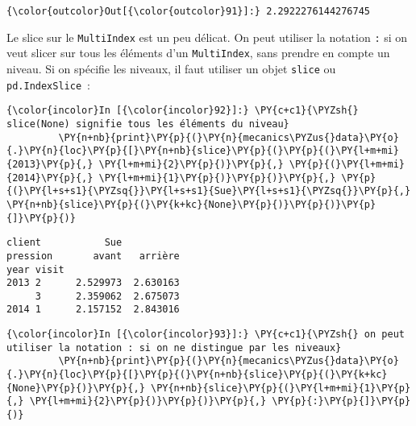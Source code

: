 \begin{Verbatim}[commandchars=\\\{\},frame=single,framerule=0.3mm,rulecolor=\color{cellframecolor}]
{\color{outcolor}Out[{\color{outcolor}91}]:} 2.2922276144276745
\end{Verbatim}
            
    Le slice sur le \texttt{MultiIndex} est un peu délicat. On peut utiliser
la notation \texttt{:} si on veut slicer sur tous les éléments d'un
\texttt{MultiIndex}, sans prendre en compte un niveau. Si on spécifie
les niveaux, il faut utiliser un objet \texttt{slice} ou
\texttt{pd.IndexSlice}~:

    \begin{Verbatim}[commandchars=\\\{\},frame=single,framerule=0.3mm,rulecolor=\color{cellframecolor}]
{\color{incolor}In [{\color{incolor}92}]:} \PY{c+c1}{\PYZsh{} slice(None) signifie tous les éléments du niveau}
         \PY{n+nb}{print}\PY{p}{(}\PY{n}{mecanics\PYZus{}data}\PY{o}{.}\PY{n}{loc}\PY{p}{[}\PY{n+nb}{slice}\PY{p}{(}\PY{p}{(}\PY{l+m+mi}{2013}\PY{p}{,} \PY{l+m+mi}{2}\PY{p}{)}\PY{p}{,} \PY{p}{(}\PY{l+m+mi}{2014}\PY{p}{,} \PY{l+m+mi}{1}\PY{p}{)}\PY{p}{)}\PY{p}{,} \PY{p}{(}\PY{l+s+s1}{\PYZsq{}}\PY{l+s+s1}{Sue}\PY{l+s+s1}{\PYZsq{}}\PY{p}{,} \PY{n+nb}{slice}\PY{p}{(}\PY{k+kc}{None}\PY{p}{)}\PY{p}{)}\PY{p}{]}\PY{p}{)}
\end{Verbatim}


    \begin{Verbatim}[commandchars=\\\{\},frame=single,framerule=0.3mm,rulecolor=\color{cellframecolor}]
client           Sue          
pression       avant   arrière
year visit                    
2013 2      2.529973  2.630163
     3      2.359062  2.675073
2014 1      2.157152  2.843016
\end{Verbatim}

    \begin{Verbatim}[commandchars=\\\{\},frame=single,framerule=0.3mm,rulecolor=\color{cellframecolor}]
{\color{incolor}In [{\color{incolor}93}]:} \PY{c+c1}{\PYZsh{} on peut utiliser la notation : si on ne distingue par les niveaux}
         \PY{n+nb}{print}\PY{p}{(}\PY{n}{mecanics\PYZus{}data}\PY{o}{.}\PY{n}{loc}\PY{p}{[}\PY{p}{(}\PY{n+nb}{slice}\PY{p}{(}\PY{k+kc}{None}\PY{p}{)}\PY{p}{,} \PY{n+nb}{slice}\PY{p}{(}\PY{l+m+mi}{1}\PY{p}{,} \PY{l+m+mi}{2}\PY{p}{)}\PY{p}{)}\PY{p}{,} \PY{p}{:}\PY{p}{]}\PY{p}{)}
\end{Verbatim}


